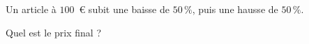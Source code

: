
Un article à $100$~€ subit une baisse de $50\,\%$, puis une hausse de $50\,\%$.

Quel est le prix final ?

\smallskip

